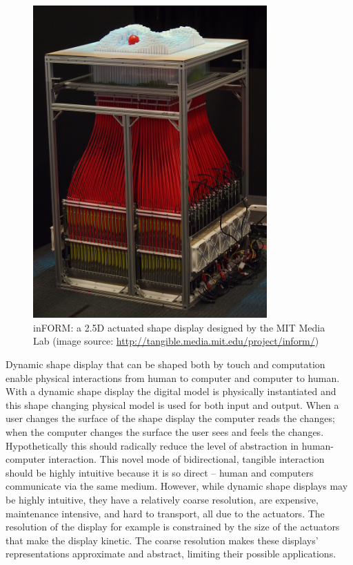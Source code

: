 \documentclass{article}
\begin{document}
\begin{figure}
        \centering
        \includegraphics[width=0.8\textwidth]{images/intro/inform_s.jpg}
        \caption{inFORM: a 2.5D actuated shape display designed by the MIT Media Lab (image source: \url{http://tangible.media.mit.edu/project/inform/})}
        \label{fig:intro:inform}
\end{figure}


Dynamic shape display that can be shaped both by touch and computation enable physical interactions from human to computer and computer to human.
With a dynamic shape display the digital model is physically instantiated and this shape changing physical model is used for both input and output. 
When a user changes the surface of the shape display the computer reads the changes; when the computer changes the surface the user sees and feels the changes. 
Hypothetically this should radically reduce the level of abstraction in human-computer interaction.
This novel mode of bidirectional, tangible interaction should be highly intuitive because it is so direct -- human and computers communicate via the same medium. 
However, while dynamic shape displays may be highly intuitive, they have a relatively coarse resolution, are expensive, maintenance intensive, and hard to transport, all due to the actuators. 
The resolution of the display for example is constrained by the size of the actuators that make the display kinetic. The coarse resolution makes these displays' representations approximate and abstract, limiting their possible applications.  
\end{document}
